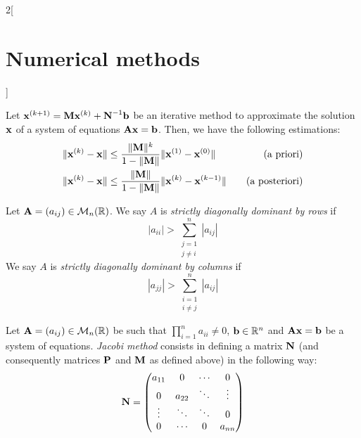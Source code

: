 \documentclass[../../../main.tex]{subfiles}
\begin{document}
\begin{multicols}{2}[\section{Numerical methods}]
    \begin{prop}
        Let $\boldsymbol{\mathrm{x}}^{(k+1)}=\boldsymbol{\mathrm{M}}\boldsymbol{\mathrm{x}}^{(k)}+\boldsymbol{\mathrm{N}}^{-1}\boldsymbol{\mathrm{b}}$ be an iterative method to approximate the solution $\boldsymbol{\mathrm{x}}$ of a system of equations $\boldsymbol{\mathrm{A}}\boldsymbol{\mathrm{x}}=\boldsymbol{\mathrm{b}}$. Then, we have the following estimations:
        \begin{align*}
            \|\boldsymbol{\mathrm{x}}^{(k)}-\boldsymbol{\mathrm{x}}\| & \leq\frac{\|\boldsymbol{\mathrm{M}}\|^k}{1-\|\boldsymbol{\mathrm{M}}\|}\|\boldsymbol{\mathrm{x}}^{(1)}-\boldsymbol{\mathrm{x}}^{(0)}\|\quad & \text{(a priori)}     \\
            \|\boldsymbol{\mathrm{x}}^{(k)}-\boldsymbol{\mathrm{x}}\| & \leq\frac{\|\boldsymbol{\mathrm{M}}\|}{1-\|\boldsymbol{\mathrm{M}}\|}\|\boldsymbol{\mathrm{x}}^{(k)}-\boldsymbol{\mathrm{x}}^{(k-1)}\|\quad & \text{(a posteriori)}
        \end{align*}
    \end{prop}
    \begin{definition}
        Let $\boldsymbol{\mathrm{A}}=(a_{ij})\in\mathcal{M}_n(\mathbb{R})$. We say $A$ is \textit{strictly diagonally dominant by rows} if $$|a_{ii}|>\sum_{\substack{j=1\\j\ne i}}^n|a_{ij}|$$
        We say $A$ is \textit{strictly diagonally dominant by columns} if $$|a_{jj}|>\sum_{\substack{i=1\\i\ne j}}^n|a_{ij}|$$
    \end{definition}
    \begin{definition}
        Let $\boldsymbol{\mathrm{A}}=(a_{ij})\in\mathcal{M}_n(\mathbb{R})$ be such that $\prod_{i=1}^na_{ii}\ne 0$, $\boldsymbol{\mathrm{b}}\in\mathbb{R}^n$ and $\boldsymbol{\mathrm{A}}\boldsymbol{\mathrm{x}}=\boldsymbol{\mathrm{b}}$ be a system of equations. \textit{Jacobi method} consists in defining a matrix $\boldsymbol{\mathrm{N}}$ (and consequently matrices $\boldsymbol{\mathrm{P}}$ and $\boldsymbol{\mathrm{M}}$ as defined above) in the following way:
        \begin{equation*}
            \boldsymbol{\mathrm{N}}=
            \begin{pmatrix}
                a_{11} & 0      & \cdots & 0      \\
                0      & a_{22} & \ddots & \vdots \\
                \vdots & \ddots & \ddots & 0      \\
                0      & \cdots & 0      & a_{nn}
            \end{pmatrix}
        \end{equation*}

\end{definition}
\end{multicols}
\end{document}
